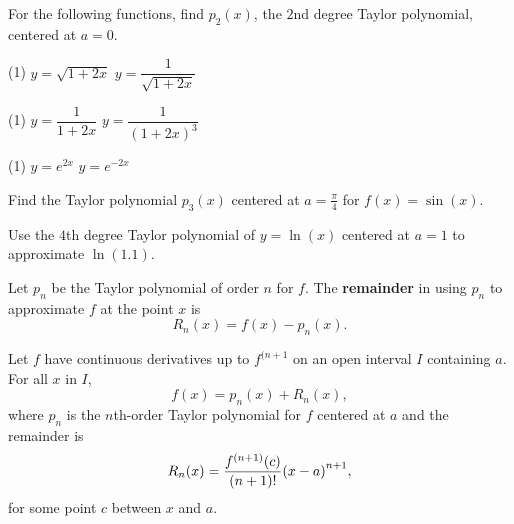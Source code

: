 \documentclass[../mathNotesPreamble]{subfiles}
\begin{document}
  \begin{ex*}[\textcolor{blue}{LC 26.2}]
    For the following functions, find $p_2(x)$, the $2$nd degree Taylor polynomial, centered at $a=0$.
  \end{ex*}
  \begin{tasks}[after-item-skip=\stretch{1}, label=,item-indent=0pt](1)
    \task $y=\sqrt{1+2x}$
    \task $y=\dfrac{1}{\sqrt{1+2x}}$
  \end{tasks}
  \pagebreak
  \begin{tasks}[after-item-skip=\stretch{1}, label=,item-indent=0pt](1)
    \task $y=\dfrac{1}{1+2x}$
    \task $y=\dfrac{1}{(1+2x)^3}$
  \end{tasks}
  \pagebreak
  \begin{tasks}[after-item-skip=\stretch{1}, label=,item-indent=0pt](1)
    \task $y=e^{2x}$
    \task $y=e^{-2x}$
  \end{tasks}
  \pagebreak

  \begin{ex*}[\textcolor{blue}{LC 26.3}]
    Find the Taylor polynomial $p_3(x)$ centered at $a=\frac{\pi}{4}$ for $f(x)=\sin(x)$.
  \end{ex*}
  \pagebreak

  \begin{ex*}[\textcolor{blue}{LC 26.4}]
    Use the $4$th degree Taylor polynomial of $y=\ln(x)$ centered at $a=1$ to approximate $\ln(1.1)$.
  \end{ex*}
  \pagebreak

  \begin{defn*}
    Let $p_n$ be the Taylor polynomial of order $n$ for $f$. The \textbf{remainder} in using $p_n$ to approximate $f$ at the point $x$ is
      \[R_n(x)=f(x)-p_n(x).\]
  \end{defn*}

  \begin{thmBox*}
    Let $f$ have continuous derivatives up to $f^{(n+1}$ on an open interval $I$ containing $a$. For all $x$ in $I$,
      \[f(x)=p_n(x)+R_n(x),\]
    where $p_n$ is the $n$th-order Taylor polynomial for $f$ centered at $a$ and the remainder is
      \[R_n(x)=\frac{f^{(n+1)}(c)}{(n+1)!}{\left(x-a\right)}^{n+1},\]
    for some point $c$ between $x$ and $a$.
  \end{thmBox*}
\end{document}
